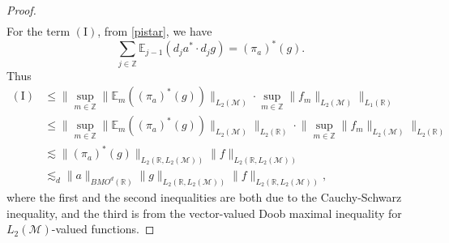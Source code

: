 \documentclass[oneside,english,a4wide]{amsart}
\numberwithin{equation}{section}
\numberwithin{figure}{section}
\theoremstyle{plain}
\theoremstyle{plain}
\theoremstyle{definition}
\theoremstyle{plain}
\theoremstyle{remark}
\theoremstyle{definition}
\theoremstyle{remark}
\theoremstyle{definition}
\newcommand{\8}{\infty}
\begin{document}
\begin{proof}
\begin{equation*}
\begin{aligned}
		\end{aligned}
	\end{equation*}
	For the term $(\text{I})$, from \eqref{pistar}, we have 
	$$  \sum_{j\in\mathbb{Z}}\mathbb{E}_{j-1}(d_ja^*\cdot d_jg)=(\pi_a)^*(g).  $$
	Thus
	\begin{equation}\label{I}
		\begin{aligned}
			(\text{I}){}&\le \biggl\|\sup_{m\in\mathbb{Z}}\biggl\|\mathbb{E}_{m}((\pi_a)^*(g))\biggr\|_{L_2(\mathcal{M})}\cdot \sup_{m\in\mathbb{Z}}\|f_m\|_{L_2(\mathcal{M})}\biggr\|_{L_1(\mathbb{R})}\\
			&\le \biggl\|\sup_{m\in\mathbb{Z}}\biggl\|\mathbb{E}_{m}((\pi_a)^*(g))\biggr\|_{L_2(\mathcal{M})}\biggr\|_{L_2(\mathbb{R})}\cdot \biggl\|\sup_{m\in\mathbb{Z}}\|f_m\|_{L_2(\mathcal{M})}\biggr\|_{L_2(\mathbb{R})}\\
			&\lesssim \|(\pi_{a})^*(g)\|_{L_2(\mathbb{R},L_2(\mathcal{M}))}\|f\|_{L_2(\mathbb{R},L_2(\mathcal{M}))}\\
			&\lesssim_d \|a\|_{BMO^d(\mathbb{R})}\|g\|_{L_2(\mathbb{R},L_2(\mathcal{M}))}\|f\|_{L_2(\mathbb{R},L_2(\mathcal{M}))},
		\end{aligned}
	\end{equation}
	where the first and the second inequalities are both due to the Cauchy-Schwarz inequality, and the third is from the  vector-valued Doob maximal inequality for $L_2(\mathcal{M})$-valued functions.
	

\end{proof}
\end{document}
